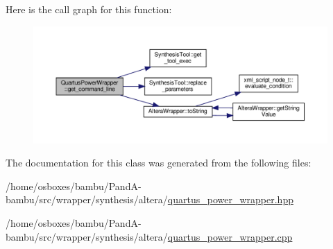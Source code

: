 Here is the call graph for this function\+:
\nopagebreak
\begin{figure}[H]
\begin{center}
\leavevmode
\includegraphics[width=350pt]{d0/dab/classQuartusPowerWrapper_aa1ec11014b508f11b22e8882d53d3cb2_cgraph}
\end{center}
\end{figure}


The documentation for this class was generated from the following files\+:\begin{DoxyCompactItemize}
\item 
/home/osboxes/bambu/\+Pand\+A-\/bambu/src/wrapper/synthesis/altera/\hyperlink{quartus__power__wrapper_8hpp}{quartus\+\_\+power\+\_\+wrapper.\+hpp}\item 
/home/osboxes/bambu/\+Pand\+A-\/bambu/src/wrapper/synthesis/altera/\hyperlink{quartus__power__wrapper_8cpp}{quartus\+\_\+power\+\_\+wrapper.\+cpp}\end{DoxyCompactItemize}
